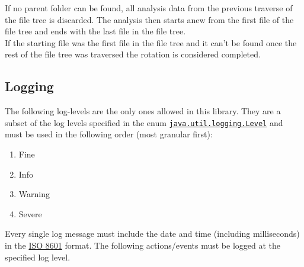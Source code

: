 \documentclass[11pt]{article} %
\begin{document}
    If no parent folder can be found, all analysis data from the previous traverse of the file tree is discarded. The analysis then starts anew from the first file of the file tree and ends with the last file in the file tree.\\
    If the starting file was the first file in the file tree and it can't be found once the rest of the file tree was traversed the rotation is considered completed.


    \subsection{Logging}\label{sec:3.2}

    The following log-levels are the only ones allowed in this library. They are a subset of the log levels specified in the enum \href{https://docs.oracle.com/javase/8/docs/api/java/util/logging/class-use/Level.html}{\texttt{java.util.logging.Level}} and must be used in the following order (most granular first):

    \begin{enumerate}
        \item Fine
        \item Info
        \item Warning
        \item Severe
    \end{enumerate}

    Every single log message must include the date and time (including milliseconds) in the \href{https://en.wikipedia.org/wiki/ISO_8601}{ISO 8601} format. The following actions/events must be logged at the specified log level.
\end{document}
